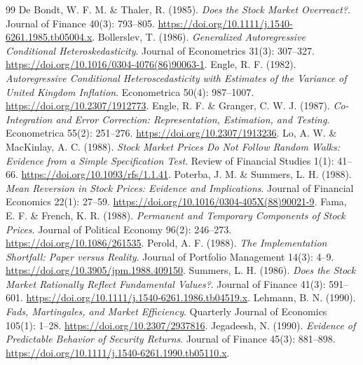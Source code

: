 \begin{thebibliography}{99}
 De Bondt, W. F. M. \& Thaler, R. (1985). \emph{Does the Stock Market Overreact?}. Journal of Finance 40(3): 793--805. \href{https://doi.org/10.1111/j.1540-6261.1985.tb05004.x}{https://doi.org/10.1111/j.1540-6261.1985.tb05004.x}.
 Bollerslev, T. (1986). \emph{Generalized Autoregressive Conditional Heteroskedasticity}. Journal of Econometrics 31(3): 307--327. \href{https://doi.org/10.1016/0304-4076(86)90063-1}{https://doi.org/10.1016/0304-4076(86)90063-1}.
 Engle, R. F. (1982). \emph{Autoregressive Conditional Heteroscedasticity with Estimates of the Variance of United Kingdom Inflation}. Econometrica 50(4): 987--1007. \href{https://doi.org/10.2307/1912773}{https://doi.org/10.2307/1912773}.
 Engle, R. F. \& Granger, C. W. J. (1987). \emph{Co-Integration and Error Correction: Representation, Estimation, and Testing}. Econometrica 55(2): 251--276. \href{https://doi.org/10.2307/1913236}{https://doi.org/10.2307/1913236}.
 Lo, A. W. \& MacKinlay, A. C. (1988). \emph{Stock Market Prices Do Not Follow Random Walks: Evidence from a Simple Specification Test}. Review of Financial Studies 1(1): 41--66. \href{https://doi.org/10.1093/rfs/1.1.41}{https://doi.org/10.1093/rfs/1.1.41}.
 Poterba, J. M. \& Summers, L. H. (1988). \emph{Mean Reversion in Stock Prices: Evidence and Implications}. Journal of Financial Economics 22(1): 27--59. \href{https://doi.org/10.1016/0304-405X(88)90021-9}{https://doi.org/10.1016/0304-405X(88)90021-9}.
 Fama, E. F. \& French, K. R. (1988). \emph{Permanent and Temporary Components of Stock Prices}. Journal of Political Economy 96(2): 246--273. \href{https://doi.org/10.1086/261535}{https://doi.org/10.1086/261535}.
 Perold, A. F. (1988). \emph{The Implementation Shortfall: Paper versus Reality}. Journal of Portfolio Management 14(3): 4--9. \href{https://doi.org/10.3905/jpm.1988.409150}{https://doi.org/10.3905/jpm.1988.409150}.
 Summers, L. H. (1986). \emph{Does the Stock Market Rationally Reflect Fundamental Values?}. Journal of Finance 41(3): 591--601. \href{https://doi.org/10.1111/j.1540-6261.1986.tb04519.x}{https://doi.org/10.1111/j.1540-6261.1986.tb04519.x}.
 Lehmann, B. N. (1990). \emph{Fads, Martingales, and Market Efficiency}. Quarterly Journal of Economics 105(1): 1--28. \href{https://doi.org/10.2307/2937816}{https://doi.org/10.2307/2937816}.
 Jegadeesh, N. (1990). \emph{Evidence of Predictable Behavior of Security Returns}. Journal of Finance 45(3): 881--898. \href{https://doi.org/10.1111/j.1540-6261.1990.tb05110.x}{https://doi.org/10.1111/j.1540-6261.1990.tb05110.x}.

\end{thebibliography}
